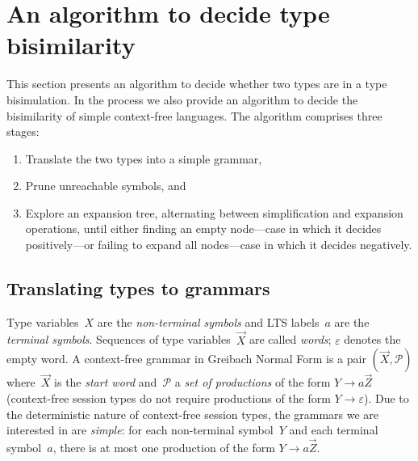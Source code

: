 \section{An algorithm to decide type bisimilarity}
\label{sec:algorithm}



This section presents an algorithm to decide whether two types are in
a type bisimulation. In the process we also provide an algorithm to
decide the bisimilarity of simple context-free languages.
%
The algorithm comprises three stages:
%
\begin{enumerate}
\item Translate the two types into a simple grammar,
\item Prune unreachable symbols, and
\item Explore an expansion tree, alternating between simplification
  and expansion operations, until either finding an empty node---case
  in which it decides positively---or failing to expand all nodes---case
  in which it decides negatively.
\end{enumerate}

\subsection{Translating types to grammars}


Type variables~$X$ are the \emph{non-terminal symbols} and LTS
labels~$a$ are the \emph{terminal symbols}. Sequences of type
variables~$\vec X$ are called \emph{words}; $\varepsilon$ denotes the
empty word.
%
A context-free grammar in Greibach Normal Form is a pair
$(\vec X,\mathcal P)$ where~$\vec X$ is the \emph{start word}
and~$\mathcal P$ a \emph{set of productions} of the form
$Y \rightarrow a\vec Z$ (context-free session types do not require
productions of the form $Y \rightarrow\varepsilon$).
%
Due to the deterministic nature of context-free session types, the
grammars we are interested in are \emph{simple}: for each
non-terminal symbol~$Y$ and each terminal symbol~$a$, there is at most
one production of the form $Y \rightarrow a\vec Z$.

